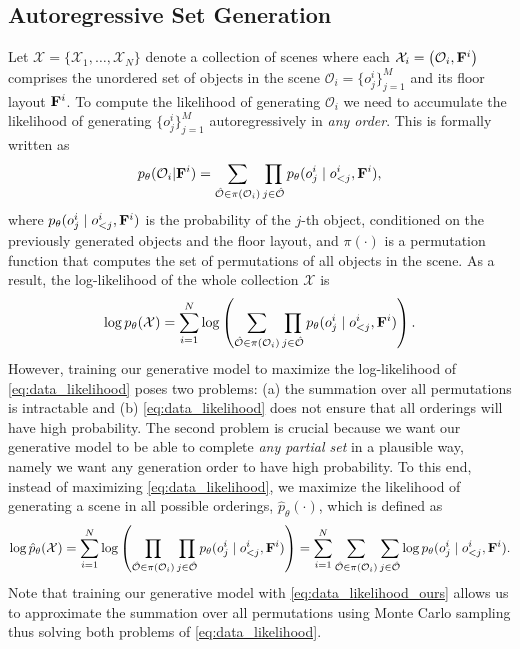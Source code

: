 \documentclass{article}
\newcommand{\cO}{\mathcal{O}}
\newcommand{\cX}{\mathcal{X}}
\begin{document}
\subsection{Autoregressive Set Generation}\label{subsec:set_gen}
Let $\cX = \{\cX_1, \dots, \cX_N\}$ denote a collection of scenes where each
$\cX_i=\left(\cO_i, \bF^i\right)$ comprises the unordered set of objects in the
scene $\cO_i=\{o_j^i\}_{j=1}^M$ and its floor layout $\mathbf{F}^i$. To compute the
likelihood of generating $\cO_i$ we need to accumulate the likelihood of
generating $\{o_j^i\}_{j=1}^M$ autoregressively in \emph{any order}. This is
formally written as
\begin{equation}
    p_{\theta}(\cO_i | \bF^i) = 
        \sum_{\hat{\cO}\in \pi(\cO_i)}
        \prod_{j\in \hat{\cO}}
            p_{\theta}(o_j^i \mid o_{<j}^i, \bF^i),
    \label{eq:scene_probability}
\end{equation}
where $p_{\theta}(o_j^i \mid o_{<j}^i, \mathbf{F}^i)$ is the probability of the $j$-th
object, conditioned on the previously generated objects and the floor layout,
and $\pi(\cdot)$ is a permutation function that computes the set of
permutations of all objects in the scene. As a result, the log-likelihood of
the whole collection $\cX$ is
\begin{equation}
    \log p_{\theta}(\cX) = 
    \sum_{i=1}^N\log\left(\sum_{\hat{\cO}\in \pi(\cO_i)}\prod_{j\in \hat{\cO}}
    p_{\theta}(o_j^i \mid o_{<j}^i, \bF^i)\right).
    \label{eq:data_likelihood}
\end{equation}
However, training our generative model to maximize the log-likelihood of
\eqref{eq:data_likelihood} poses two problems: (a) the summation over all
permutations is intractable and (b) \eqref{eq:data_likelihood} does not ensure
that all orderings will have high probability. The second problem is crucial
because we want our generative model to be able to complete \emph{any
partial set} in a plausible way, namely we want any generation order to have
high probability. To this end, instead of maximizing
\eqref{eq:data_likelihood}, we maximize the likelihood of generating a scene in
all possible orderings, $\hat{p}_\theta(\cdot)$, which is defined as
\begin{equation}
    \log \hat{p}_{\theta}(\cX)
    = \sum_{i=1}^N\log\left(\prod_{\hat{\cO}\in \pi(\cO_i)}
       \prod_{j\in \hat{\cO}}p_{\theta}(o_j^i \mid o_{<j}^i, \bF^i)\right)
    = \sum_{i=1}^N\sum_{\hat{\cO}\in \pi(\cO_i)}
       \sum_{j\in \hat{\cO}}\log p_{\theta}(o_j^i \mid o_{<j}^i, \bF^i).
    \label{eq:data_likelihood_ours}
\end{equation}
Note that training our generative model with \eqref{eq:data_likelihood_ours}
allows us to approximate the summation over all permutations using Monte Carlo
sampling thus solving both problems of \eqref{eq:data_likelihood}.
\end{document}
